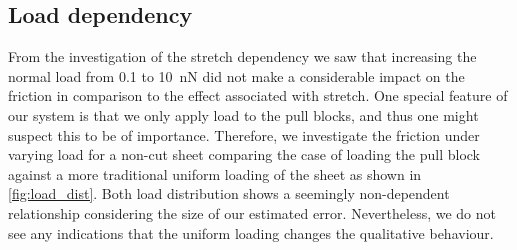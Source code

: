 \subsection{Load dependency}\label{sec:load_dependency}
From the investigation of the stretch dependency we saw that increasing the normal load from 0.1 to \SI{10}{nN} did not make a considerable impact on the friction in comparison to the effect associated with stretch. One special feature of our system is that we only apply load to the pull blocks, and thus one might suspect this to be of importance. Therefore, we investigate the friction under varying load for a non-cut sheet comparing the case of loading the pull block against a more traditional uniform loading of the sheet as shown in \cref{fig:load_dist}. Both load distribution shows a seemingly non-dependent relationship considering the size of our estimated error. Nevertheless, we do not see any indications that the uniform loading changes the qualitative behaviour.

